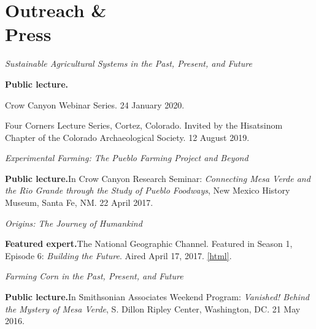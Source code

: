 \section{Outreach \& \\Press}

\emph{Sustainable Agricultural Systems in the Past, Present, and Future}
\nopagebreak
\begin{list1}
\item[] {\bf Public lecture.}
\begin{list2}
\item[-] Crow Canyon Webinar Series. 24 January 2020.

\item[-] Four Corners Lecture Series, Cortez, Colorado. Invited by the Hisatsinom Chapter of the Colorado Archaeological Society. 12 August 2019.
\end{list2}
\end{list1}

\emph{Experimental Farming: The Pueblo Farming Project and Beyond}
\nopagebreak
\begin{list1}
\item[] {\bf Public lecture.}\hspace{.2cm}In Crow Canyon Research Seminar: \emph{Connecting Mesa Verde and the Rio Grande through the Study of Pueblo Foodways}, New Mexico History Museum, Santa Fe, NM. 22 April 2017.
\end{list1}

\emph{Origins: The Journey of Humankind}
\nopagebreak
\begin{list1}
\item[] {\bf Featured expert.}\hspace{.2cm}The National Geographic Channel. Featured in Season 1, Episode 6: \emph{Building the Future}. Aired April 17, 2017. \href{https://www.natgeotv.com/int/origins-the-journey-of-humankind}{[html]}.
\end{list1}

\newpage
\emph{Farming Corn in the Past, Present, and Future}
\nopagebreak
\begin{list1}
\item[] {\bf Public lecture.}\hspace{.2cm}In Smithsonian Associates Weekend Program: \emph{Vanished! Behind the Mystery of Mesa Verde}, S. Dillon Ripley Center, Washington, DC. 21 May 2016.
\end{list1}

